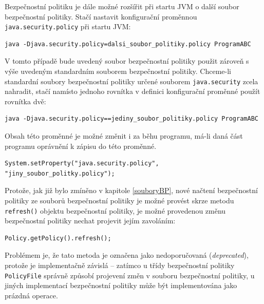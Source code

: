Bezpečnostní politiku je dále možné rozšířit při startu JVM o další soubor bezpečnostní politiky. Stačí nastavit konfigurační proměnnou {\tt java.security.policy} při startu JVM: \cite[5.3.1]{oaks}

\begin{lstlisting}[caption=Spuštění JVM s vlastním souborem bezpečnostní politiky, label=nastaveniBP]
java -Djava.security.policy=dalsi_soubor_politiky.policy ProgramABC
\end{lstlisting}

V tomto případě bude uvedený soubor bezpečnostní politiky použit zároveň s výše uvedeným standardním souborem bezpečnostní politiky. Chceme-li standardní soubory bezpečnostní politiky určené souborem {\tt java.security} zcela nahradit, stačí namísto jednoho rovnítka v definici konfigurační proměnné použít rovnítka dvě: \cite[5.3.1]{oaks}

\begin{lstlisting}[caption=Spuštění JVM jen s vlastním souborem bezpečnostní politiky, label=nastaveniBP2]
java -Djava.security.policy==jediny_soubor_politiky.policy ProgramABC
\end{lstlisting}

Obsah této proměnné je možné změnit i za běhu programu, má-li daná část programu oprávnění k zápisu do této proměnné.

\begin{lstlisting}[caption=Nastavení souboru bezpečnostní politiky zevnitř JVM, label=nastaveniBP3]
System.setProperty("java.security.policy", "jiny_soubor_politky.policy");
\end{lstlisting}

Protože, jak již bylo zmíněno v kapitole \ref{souboryBP}, nové načtení bezpečnostní politiky ze souborů bezpečnostní politiky je možné provést
skrze metodu {\tt refresh()} objektu bezpečnostní politiky, je možné provedenou změnu bezpečnostní politiky nechat projevit jejím zavoláním:

\begin{lstlisting}[caption=Znovunačtení souboru bezpečnostní politiky, label=refreshBP]
Policy.getPolicy().refresh();
\end{lstlisting}

Problémem je, že tato metoda je označena jako nedoporučovaná ({\it deprecated}), protože je implementačně závislá -- zatímco u třídy bezpečnostní politiky {\tt PolicyFile} správně způsobí projevení změn v souboru bezpečnostní politiky, u jiných implementací bezpečnostní politiky může být implementována jako prázdná operace. \cite{refPolicy}

